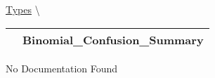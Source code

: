 \hypertarget{ecldoc:logisticregression.types.binomial_confusion_summary}{}
\hspace{0pt} \hyperlink{ecldoc:LogisticRegression.Types}{Types} \textbackslash 

{\renewcommand{\arraystretch}{1.5}
\begin{tabularx}{\textwidth}{|>{\raggedright\arraybackslash}l|X|}
\hline
\hspace{0pt}\mytexttt{\color{red} } & \textbf{Binomial\_Confusion\_Summary} \\
\hline
\end{tabularx}
}

\par





No Documentation Found







